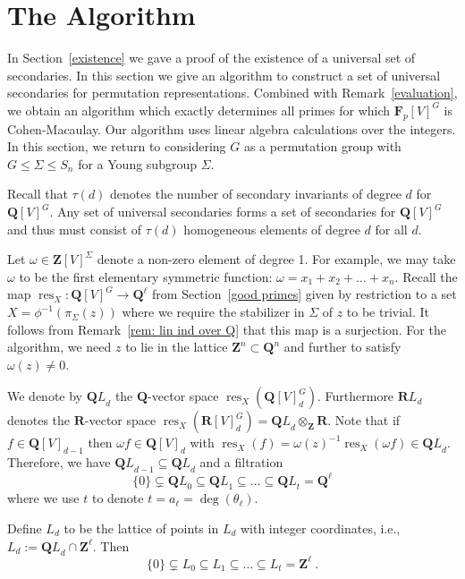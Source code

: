 \documentclass[12pt]{amsart}
\DeclareMathOperator{\res}{res}
\renewcommand{\leq}{\leqslant}
\newcommand{\QQ}{\mathbf{Q}} %
\newcommand{\RR}{\mathbf{R}} %
\newcommand{\ZZ}{\mathbf{Z}} %
\newcommand{\FF}{\mathbf{F}} %
\newcommand{\QQ}{\mathbb{Q}} %
\newcommand{\RR}{\mathbb{R}} %
\newcommand{\ZZ}{\mathbb{Z}} %
\newcommand{\FF}{\mathbb{F}} %
\theoremstyle{definition}
\newcommand{\QL}{{\QQ L}}
\newcommand{\RL}{{\RR L}}
\begin{document}
\section{The Algorithm}\label{section:constructing}

In Section~\ref{existence} we gave a proof of the existence of a universal set of secondaries.  
In this section we give an algorithm to construct a set of universal secondaries for permutation representations. 
Combined with Remark~\ref{evaluation}, we obtain an algorithm which exactly determines all primes for which $\FF_p[V]^G$ is Cohen-Macaulay. Our algorithm uses linear algebra calculations over the integers. In this section, we return to considering $G$ as a permutation group with $G \leq \Sigma \leq S_n$ for a Young subgroup $\Sigma$.

Recall that $\tau(d)$ denotes the number of secondary
invariants of degree $d$ for $\QQ[V]^G$. Any set of universal secondaries forms a set of secondaries for
$\QQ[V]^G$ and thus must consist of $\tau(d)$ homogeneous
elements of degree $d$ for all $d$.





Let $\omega\in \ZZ[V]^\Sigma$ denote a non-zero element of degree 1.
For example, we may take $\omega$ to be the first elementary 
symmetric function: $\omega = x_1 + x_2 + \dots + x_n$.
Recall the map $\res_X : \QQ[V]^G \to \QQ^\ell$ from 
Section~\ref{good primes} given by restriction to a set $X=\phi^{-1}(\pi_\Sigma(z))$
where we require the stabilizer in $\Sigma$ of $z$ to be trivial.  
It follows from Remark~\ref{rem: lin ind over Q} that this map is a surjection.
For the algorithm, we need $z$ to lie in the lattice $\ZZ^n \subset \QQ^n$ and further 
to satisfy $\omega(z)\neq 0$.
  

We denote by $\QL_d$ the $\QQ$-vector space $\res_X(\QQ[V]^G_d)$.
Furthermore $\RL_d$ denotes the $\RR$-vector space $\res_X(\RR[V]^G_d)
= \QL_d \otimes_\ZZ \RR$.
Note that if $f \in \QQ[V]_{d-1}$ then $\omega f \in \QQ[V]_{d}$
with $\res_X(f)=\omega(z)^{-1} \res_X(\omega f) \in \QL_{d}$.  
Therefore, we have $\QL_{d-1}\subseteq \QL_{d}$ and a filtration
$$\{0\} \subsetneq \QL_0 \subseteq \QL_1 \subseteq \dots \subseteq \QL_t
=\QQ^\ell$$ where we use $t$ to denote $t=a_\ell=\deg(\theta_\ell)$.

Define $L_d$ to be the lattice of points in $L_d$ with integer coordinates, 
i.e., $L_d := \QL_d \cap \ZZ^\ell$.
Then 
$$\{0\} \subsetneq L_0 \subseteq L_1 \subseteq \dots \subseteq L_{t}
=\ZZ^\ell\ .$$
\end{document}
